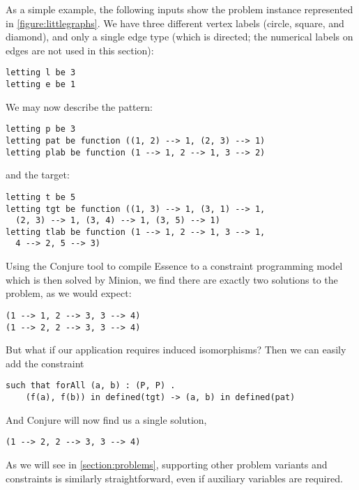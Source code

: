 \documentclass[runningheads]{llncs}
\begin{document}
As a simple example, the following inputs show the problem instance represented in
\cref{figure:littlegraphs}. We have three different vertex labels (circle, square, and diamond), and
only a single edge type (which is directed; the numerical labels on edges are not used in this
section):
\begin{lstlisting}
letting l be 3
letting e be 1
\end{lstlisting}
We may now describe the pattern:
\begin{lstlisting}
letting p be 3
letting pat be function ((1, 2) --> 1, (2, 3) --> 1)
letting plab be function (1 --> 1, 2 --> 1, 3 --> 2)
\end{lstlisting}
and the target:
\begin{lstlisting}
letting t be 5
letting tgt be function ((1, 3) --> 1, (3, 1) --> 1,
  (2, 3) --> 1, (3, 4) --> 1, (3, 5) --> 1)
letting tlab be function (1 --> 1, 2 --> 1, 3 --> 1,
  4 --> 2, 5 --> 3)
\end{lstlisting}
Using the Conjure tool to compile Essence to a constraint programming model which is then solved by
Minion, we find there are exactly two solutions to the problem, as we would expect:
\begin{lstlisting}
(1 --> 1, 2 --> 3, 3 --> 4)
(1 --> 2, 2 --> 3, 3 --> 4)
\end{lstlisting}
But what if our application requires induced isomorphisms? Then we can easily add the constraint
\begin{lstlisting}
such that forAll (a, b) : (P, P) .
    (f(a), f(b)) in defined(tgt) -> (a, b) in defined(pat)
\end{lstlisting}
And Conjure will now find us a single solution,
\begin{lstlisting}
(1 --> 2, 2 --> 3, 3 --> 4)
\end{lstlisting}
As we will see in \cref{section:problems}, supporting other problem variants and constraints is
similarly straightforward, even if auxiliary variables are required. %
\end{document}
